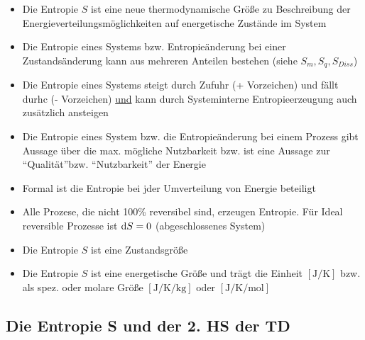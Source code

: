 \begin{itemize}
	\item Die Entropie $S$ ist eine neue thermodynamische Größe zu Beschreibung der Energieverteilungsmöglichkeiten auf energetische Zustände im System
	\item Die Entropie eines Systems bzw. Entropieänderung bei einer Zustandsänderung kann aus mehreren Anteilen bestehen (siehe $S_m, S_q, S_{Diss}$)
	\item Die Entropie eines Systems steigt durch Zufuhr (+ Vorzeichen) und fällt durhc (- Vorzeichen) \underline{und} kann durch Systeminterne Entropieerzeugung auch zusätzlich ansteigen
	\item Die Entropie eines System bzw. die Entropieänderung bei einem Prozess gibt Aussage über die max. mögliche Nutzbarkeit bzw. ist eine Aussage zur "`Qualität"'bzw. "`Nutzbarkeit"' der Energie
	\item Formal ist die Entropie bei jder Umverteilung von Energie beteiligt
	\item Alle Prozese, die nicht 100\% reversibel sind, erzeugen Entropie. \linebreak 
	Für Ideal reversible Prozesse ist $\mathop{}\!\mathrm{d} S=0$ (abgeschlossenes System)
	\item Die Entropie $S$ ist eine Zustandsgröße
	\item Die Entropie $S$ ist eine energetische Größe und trägt die Einheit $\left[\si{\joule \per \kelvin}\right]$ bzw. als spez. oder molare Größe $\left[\si{\joule \per \kelvin \per \kg}\right]$ oder $\left[\si{\joule \per \kelvin \per \mol}\right]$
\end{itemize}

\subsection{Die Entropie S und der 2. HS der TD}




